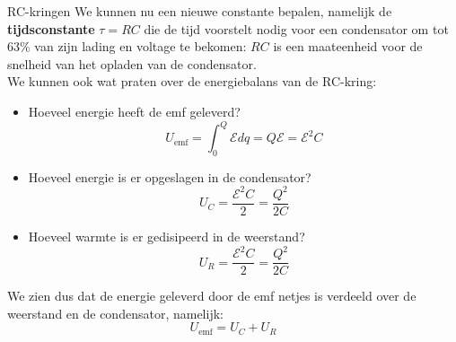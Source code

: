 \begin{app}[RC-kringen]{RC-kringen}
    \noindent We kunnen nu een nieuwe constante bepalen, namelijk de \textbf{tijdsconstante} $\tau = RC 
    $    
    die de tijd voorstelt nodig voor een condensator om tot $ 63\%$ van zijn lading en voltage te bekomen: $RC$ is een maateenheid voor de snelheid van het opladen van de condensator. \\
    
    \noindent We kunnen ook wat praten over de energiebalans van de RC-kring: 
    \begin{itemize}
        \item Hoeveel energie heeft de emf geleverd? 
        \begin{equation*}
            U_{\text{emf}} = \int_0^Q \mathcal{E} dq = Q\mathcal{E} = \mathcal{E}^2C
        \end{equation*}
        \item Hoeveel energie is er opgeslagen in de condensator?
        \begin{equation*}
            U_{C} = \dfrac{\mathcal{E}^2C}{2} = \dfrac{Q^2}{2C}
        \end{equation*}
        \item Hoeveel warmte is er gedisipeerd in de weerstand?
        \begin{equation*}
            U_{R} = \dfrac{\mathcal{E}^2C}{2} = \dfrac{Q^2}{2C}
        \end{equation*}
    \end{itemize}
    We zien dus dat de energie geleverd door de emf netjes is verdeeld over de weerstand en de condensator, namelijk:
    \begin{equation*}
        U_{\text{emf}} = U_{C} + U_{R}
    \end{equation*}
\end{app}